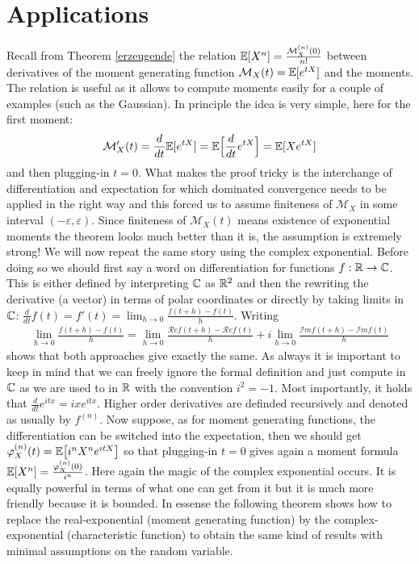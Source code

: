 \section{Applications}
Recall from Theorem \ref{erzeugende} the relation $\mathbb{E}[X^n]=\frac{\mathcal M_X^{(n)}(0)}{n!}$ between derivatives of the moment generating function $\mathcal M_X(t)=\mathbb{E}[e^{tX}]$ and the moments. The relation is useful as it allows to compute moments easily for a couple of examples (such as the Gaussian). In principle the idea is very simple, here for the first moment: $$\mathcal M'_X(t)=\frac{d}{dt}\mathbb{E}[e^{tX}]=\mathbb{E}\Big[\frac{d}{dt}e^{tX}\Big]=\mathbb{E}[X e^{tX}]$$ and then plugging-in $t=0$. What makes the proof tricky is the interchange of differentiation and expectation for which dominated convergence needs to be applied in the right way and this forced us to assume finiteness of $\mathcal M_X$ in some interval $(-\varepsilon, \varepsilon)$. Since finiteness of $\mathcal M_X(t)$ means existence of exponential moments the theorem looks much better than it is, the assumption is extremely strong! We will now repeat the same story using the complex exponential. Before doing so we should first say a word on differentiation for functions $f:\mathbb{R}\to \mathbb{C}$. This is either defined by interpreting $\mathbb{C}$ as $\mathbb{R}^2$ and then the rewriting the derivative (a vector) in terms of polar coordinates or directly by taking limits in $\mathbb{C}$: $\frac{d}{dt} f(t)=f'(t)=\lim_{h\to 0}\frac{f(t+h)-f(t)}{h}$. Writing 
\begin{align*}
	\lim_{h\to 0}\frac{f(t+h)-f(t)}{h}=\lim_{h\to 0}\frac{\mathcal R ef(t+h)-\mathcal R ef(t)}{h}+i\lim_{h\to 0}\frac{\mathcal I m f(t+h)-\mathcal I mf(t)}{h}
\end{align*}
shows that both approaches give exactly the same. As always it is important to keep in mind that we can freely ignore the formal definition and just compute in $\mathbb{C}$ as we are used to in $\mathbb{R}$ with the convention $i^2=-1$. Most importantly, it holds that $\frac{d}{dt} e^{itx}=ix e^{itx}$. Higher order derivatives are definded recursively and denoted as usually by $f^{(n)}$. Now suppose, as for moment generating functions, the differentiation can be switched into the expectation, then we should get $\varphi_X^{(n)}(t) = \mathbb{E} \big[ i^n X^ne^{itX} \big]$ so that plugging-in $t=0$ gives again a moment formula $\mathbb{E}[X^n]=\frac{\varphi_X^{(n)}(0)}{i^n}$. Here again the magic of the complex exponential occurs. It is equally powerful in terms of what one can get from it but it is much more friendly because it is bounded. In essense the following theorem shows how to replace the real-exponential (moment generating function) by the complex-exponential (characteristic function) to obtain the same kind of results with minimal assumptions on the random variable.
